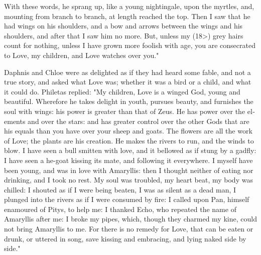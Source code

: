 \documentclass{book}
\begin{document}
\begin{pairs}
\begin{Rightside}
\begin{english}
  With these words, he sprang up, like a young nightingale, upon the myrtles, and, mounting from branch to branch, at length reached the top.  Then I saw that he had wings on his shoulders, and a bow and arrows between the wings and his shoulders, and after that I saw him no more.  But, unless my (18>) grey hairs count for nothing, unless I have grown more foolish with age, you are consecrated to Love, my children, and Love watches over you."
\pend


  Daphnis and Chloe were as delighted as if they had heard some fable, and not a true story, and asked what Love was; whether it was a bird or a child, and what it could do.  Philetas replied: "My children, Love is a winged God, young and beautiful.  Wherefore he takes delight in youth, pursues beauty, and furnishes the soul with wings: his power is greater than that of Zeus.  He has power over the elements and over the stars: and has greater control over the other Gods that are his equals than you have over your sheep and goats.  The flowers are all the work of Love; the plants are his creation.  He makes the rivers to run, and the winds to blow.  I have seen a bull smitten with love, and it bellowed as if stung by a gadfly: I have seen a he-goat kissing its mate, and following it everywhere.  I myself have been young, and was in love with Amaryllis: then I thought neither of eating nor drinking, and I took no rest.  My soul was troubled, my heart beat, my body was chilled: I shouted as if I were being beaten, I was as silent as a dead man, I plunged into the rivers as if I were consumed by fire: I called upon Pan, himself enamoured of Pitys, to help me: I thanked Echo, who repeated the name of Amaryllis after me: I broke my pipes, which, though they charmed my kine, could not bring Amaryllis to me.  For there is no remedy for Love, that can be eaten or drunk, or uttered in song, save kissing and embracing, and lying naked side by side."
\pend



\end{english}
\end{Rightside}
\end{pairs}
\end{document}
